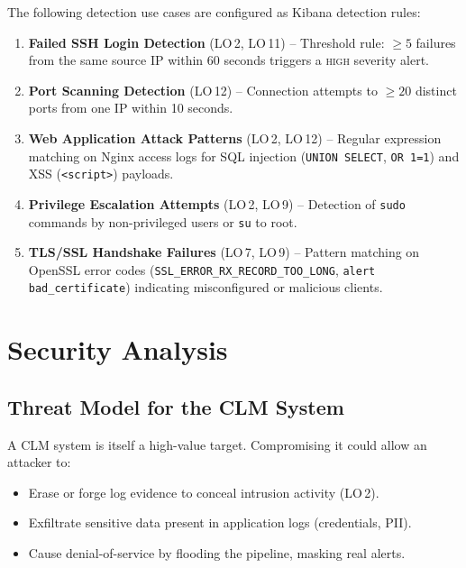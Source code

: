 \documentclass[12pt,a4paper]{report}
\begin{document}
The following detection use cases are configured as Kibana detection rules:

\begin{enumerate}[leftmargin=1.5em]
    \item \textbf{Failed SSH Login Detection} (LO\,2, LO\,11) -- Threshold rule: \(\geq 5\)
          failures from the same source IP within 60 seconds triggers a \textsc{high} severity alert.
    \item \textbf{Port Scanning Detection} (LO\,12) -- Connection attempts to \(\geq 20\)
          distinct ports from one IP within 10 seconds.
    \item \textbf{Web Application Attack Patterns} (LO\,2, LO\,12) -- Regular expression
          matching on Nginx access logs for SQL injection (\texttt{UNION SELECT},
          \texttt{OR 1=1}) and XSS (\texttt{<script>}) payloads.
    \item \textbf{Privilege Escalation Attempts} (LO\,2, LO\,9) -- Detection of
          \texttt{sudo} commands by non-privileged users or \texttt{su} to root.
    \item \textbf{TLS/SSL Handshake Failures} (LO\,7, LO\,9) -- Pattern matching on
          OpenSSL error codes (\texttt{SSL\_ERROR\_RX\_RECORD\_TOO\_LONG},
          \texttt{alert bad\_certificate}) indicating misconfigured or malicious clients.
\end{enumerate}


\chapter{Security Analysis}
\label{chap:security}

\section{Threat Model for the CLM System}

A CLM system is itself a high-value target.
Compromising it could allow an attacker to:
\begin{itemize}[leftmargin=1.5em]
    \item Erase or forge log evidence to conceal intrusion activity (LO\,2).
    \item Exfiltrate sensitive data present in application logs (credentials, PII).
    \item Cause denial-of-service by flooding the pipeline, masking real alerts.
\end{itemize}
\end{document}
